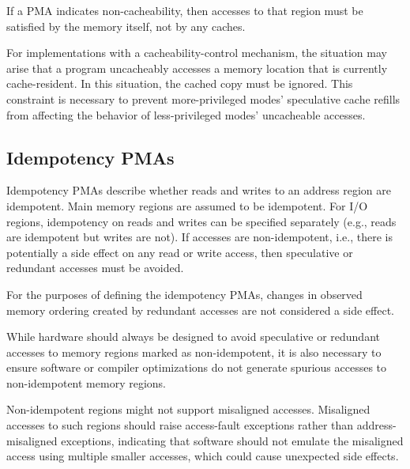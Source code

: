 If a PMA indicates non-cacheability, then accesses to that region must
be satisfied by the memory itself, not by any caches.

\begin{commentary}
For implementations with a cacheability-control mechanism, the situation
may arise that a program uncacheably accesses a memory location that is
currently cache-resident.
In this situation, the cached copy must be ignored.
This constraint is necessary to prevent more-privileged modes' speculative
cache refills from affecting the behavior of less-privileged modes'
uncacheable accesses.
\end{commentary}

\subsection{Idempotency PMAs}

Idempotency PMAs describe whether reads and writes to an address
region are idempotent.  Main memory regions are assumed to be
idempotent.  For I/O regions, idempotency on reads and writes can be
specified separately (e.g., reads are idempotent but writes are not).
If accesses are non-idempotent, i.e., there is potentially a side
effect on any read or write access, then speculative or redundant
accesses must be avoided.

For the purposes of defining the idempotency PMAs, changes in observed
memory ordering created by redundant accesses are not considered a
side effect.

\begin{commentary}
While hardware should always be designed to avoid speculative or
redundant accesses to memory regions marked as non-idempotent, it is
also necessary to ensure software or compiler optimizations do not
generate spurious accesses to non-idempotent memory regions.
\end{commentary}

\begin{commentary}
Non-idempotent regions might not support misaligned accesses.  Misaligned
accesses to such regions should raise access-fault exceptions rather than
address-misaligned exceptions, indicating that software should not emulate the
misaligned access using multiple smaller accesses, which could cause
unexpected side effects.
\end{commentary}

